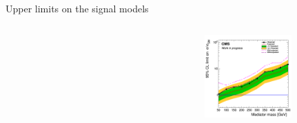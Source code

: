 \documentclass[8pt]{beamer}
\begin{document}
\begin{frame}{Upper limits on the signal models}
\begin{columns}
\begin{column}{0.33\textwidth}
\begin{center}
    		\end{center}		
		\end{column}
		\begin{column}{0.33\textwidth}
			\begin{center}
     			\includegraphics[width=1.0\textwidth, height=90pt]{figs/limit_pseudo_2018_attempt7_v2.png}
    		\end{center}		
		\end{column}
\end{columns} \vfill
\end{frame}
\end{document}
